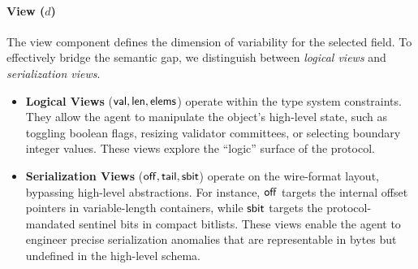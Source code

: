 \paragraph{View ($d$)}
The view component defines the dimension of variability for the selected field. To effectively bridge the semantic gap, we distinguish between \emph{logical views} and \emph{serialization views}.
\begin{itemize}
    \item \textbf{Logical Views} (${\sf val}, {\sf len}, {\sf elems}$) operate within the type system constraints. They allow the agent to manipulate the object's high-level state, such as toggling boolean flags, resizing validator committees, or selecting boundary integer values. These views explore the ``logic'' surface of the protocol.
    \item \textbf{Serialization Views} (${\sf off}, {\sf tail}, {\sf sbit}$) operate on the wire-format layout, bypassing high-level abstractions. For instance, ${\sf off}$ targets the internal offset pointers in variable-length containers, while ${\sf sbit}$ targets the protocol-mandated sentinel bits in compact bitlists. These views enable the agent to engineer precise serialization anomalies that are representable in bytes but undefined in the high-level schema.
\end{itemize}

